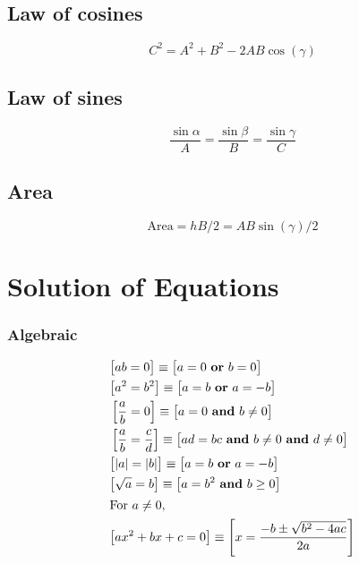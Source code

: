 \documentclass[letterpaper,9pt,fleqn]{extarticle}
\begin{document}
\begin{multicols*}{3}

\subsection*{Law of cosines}
\[
    C^2 = A^2 + B^2 - 2 A B \cos(\gamma) 
\]
\subsection*{Law of sines}
\[
    \frac{\sin{\alpha}}{A} =  \frac{\sin{\beta}}{B} =  \frac{\sin{\gamma}}{C}
\]
\subsection*{Area}
\[
    \mbox{Area} = h B / 2=  A B \sin(\gamma) /2
\]
\section*{Solution of Equations}
\vspace{-0.2in}
\subsubsection*{Algebraic}
\vspace{-0.2in}
\begin{minipage}[c]{0.3333333333333\textwidth}
\begin{align*}
& \big [a b = 0 \big ] \equiv \big [ a = 0 \mbox{ \textbf{or} } b = 0 \big ]\\
& \big [ a^2 = b^2 \big ] \equiv \big [ a = b \mbox{ \textbf{or} } a = -b \big ]\\
&\left [ \frac{a}{b} = 0 \right ] \equiv \big [ a = 0 \mbox{ \textbf{and} } b \neq 0 \big ] \\
&\left [\frac{a}{b} = \frac{c}{d}  \right ] \equiv \big [ad  = bc \mbox{ \textbf{and}  } b \neq 0  \mbox{ \textbf{and}  }  d \neq 0 \big ] \\
&\big [|a| = |b|  \big ] \equiv \big [a =b \mbox{ \textbf{or} } a = -b \big ]\\
&\big [ \sqrt{a}  = b \big ] \equiv \big [a = b^2 \mbox{ \textbf{and}  } b \ge 0 \big ] \\
\intertext{For \(a \neq 0\),}
& \big [a x^2 + b x + c = 0 \big] \equiv \left [x = \frac{-b \pm \sqrt{b^2 - 4 a c}}{2 a} \right] \\
\end{align*}
\end{minipage}
\vspace{-0.4in}

\end{multicols*}
\end{document}
